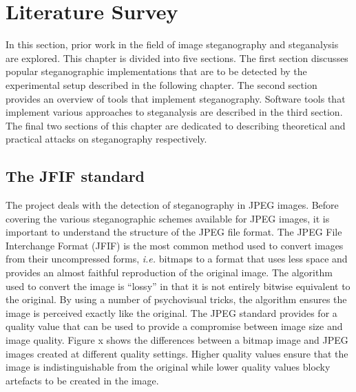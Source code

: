 \chapter{Literature Survey}
\label{ch:litsurvey}
In this section, prior work in the field of image steganography and steganalysis are explored. This chapter is divided into five sections. The first section discusses popular steganographic implementations that are to be detected by the experimental setup described in the following chapter. The second section provides an overview of tools that implement steganography. Software tools that implement various approaches to steganalysis are described in the third section. The final two sections of this chapter are dedicated to describing theoretical and practical attacks on steganography respectively.
\section{The JFIF standard}
\label{sec:jpeg}
The project deals with the detection of steganography in JPEG images. Before covering the various steganographic schemes available for JPEG images, it is important to understand the structure of the JPEG file format. The JPEG File Interchange Format (JFIF) is the most common method used to convert images from their uncompressed forms, \emph{i.e.} bitmaps to a format that uses less space and provides an almost faithful reproduction of the original image. The algorithm used to convert the image is ``lossy'' in that it is not entirely bitwise equivalent to the original. By using a number of psychovisual tricks, the algorithm ensures the image is perceived exactly like the original. The JPEG standard provides for a quality value that can be used to provide a compromise between image size and image quality. Figure x shows the differences between a bitmap image and JPEG images created at different quality settings. Higher quality values ensure that the image is indistinguishable from the original while lower quality values blocky artefacts to be created in the image.


